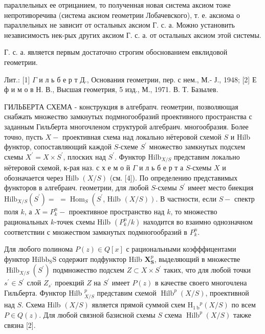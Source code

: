 \documentclass[10pt]{article}
\begin{document}
параллельных ее отрицанием, то полученная новая система аксиом тоже непротиворечива (система аксиом геометрии Лобачевского), т. е. аксиома о параллельных не зависит от остальных аксиом Г. с. а. Можно установить независимость нек-рых других аксиом Г. с. а. от остальных аксиом этой системы.



Г. с. а. является первым достаточно строгим обоснованием евклидовой геометрии.



Лит.: [1] $\Gamma$ и л ь б е р т Д., Основания геометрии, пер. с нем., М.- Ј., 1948; [2] Е ф и м о в Н. В., Высшая геометрия, 5 изд., М., 1971. В. Т. Базылев.



ГИЛЬБЕРТА СХЕМА - конструкция в алгебрапч. геометрии, позволяющая снабжать множество замкнутых подмногообразий проективного пространства с заданным Гильберта многочленом структурой алгебраич. многообразия. Более точно, пусть $X-$ проективная схема над локально нётеровой схемой $S$ и Hilb функтор, сопоставляющий каждой $S$-схеме $S^{\prime}$ множество замкнутых подсхем схемы $X^{\prime}=X \times S^{\prime}$, плоских над $S^{\prime}$. Функтор $\mathrm{Hilb}_{X / S}$ представим локально нётеровой схемой, к-рая наз. с х е м о й $\Gamma$ и л ь б е р т а $S$-схемы $X$ и обозначается через Hilb $(X / S)$ (см. [4]). По определению представимых функторов в алгебраич. геометрии, для любой $S$-схемы $S^{\prime}$ имеет место биекция $\mathrm{Hilb}_{X / S}\left(S^{\prime}\right)=$ $=\operatorname{Hom}_{S}\left(S^{\prime}\right.$, Hilb $\left.(X / S)\right)$. В частности, если $S-$ спектр поля $k$, а $X=P_{k}^{n}-$ проективное пространство над $k$, то множество рациональных $k$-точек схемы Hilb $\left(P_{k}^{n} / k\right)$ находится во взаимно однозначном соответствии с множеством замкнутых подмногообразий в $P_{k}^{n}$.



Для любого полинома $P(z) \in Q[x]$ с рациональными коэфффицентами функтор $\mathrm{Hilb} \mathrm{b}_{\mathrm{S}} \mathrm{S}$ содержит подфунктор Hilb $\boldsymbol{X}_{\mathbf{S}}^{p}$, выделяющий в множестве $\operatorname{Hilb}_{X / S}\left(S^{\prime}\right)$ подмножество подсхем $Z \subset X \times S^{\prime}$ таких, что для любой точки $s^{\prime} \in S^{\prime}$ слой $Z_{s^{\prime}}$ проекций $Z$ на $S^{\prime}$ имеет $P(z)$ в качестве своего многочлена Гильберта. Функтор Hilb ${ }_{X / S}^{p}$ представим схемой $\operatorname{Hilb}^{p}(X / S)$, проективной над $S$. Схема Hilb $(X / S)$ является прямой суммой схем $\mathrm{H}_{1 \mathrm{~b}}{ }^{p}(X / S)$ по всем $P \in Q(z)$. Для любой связной базисной схемы $S$ схема $\operatorname{Hilb}^{p}(X / S)$ также связна [2].
\end{document}
